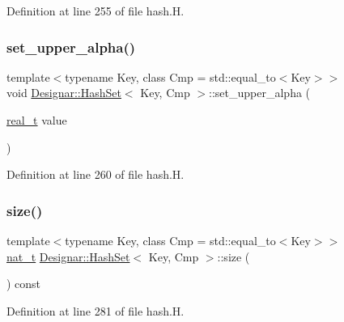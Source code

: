 Definition at line 255 of file hash.\+H.

\mbox{\label{class_designar_1_1_hash_set_a7d15d7b087df1da351a6820396ca3456}} 
\subsubsection{\texorpdfstring{set\+\_\+upper\+\_\+alpha()}{set\_upper\_alpha()}}
{\footnotesize\ttfamily template$<$typename Key, class Cmp = std\+::equal\+\_\+to$<$\+Key$>$$>$ \\
void \hyperlink{class_designar_1_1_hash_set}{Designar\+::\+Hash\+Set}$<$ Key, Cmp $>$\+::set\+\_\+upper\+\_\+alpha (\begin{DoxyParamCaption}\item[{\hyperlink{namespace_designar_aca2c32af26808dbec1f3a3071fad25ce}{real\+\_\+t}}]{value }\end{DoxyParamCaption})\hspace{0.3cm}{\ttfamily [inline]}}



Definition at line 260 of file hash.\+H.

\mbox{\label{class_designar_1_1_hash_set_a0026e1b2caf94d25b554cd6a399f691f}} 
\subsubsection{\texorpdfstring{size()}{size()}}
{\footnotesize\ttfamily template$<$typename Key, class Cmp = std\+::equal\+\_\+to$<$\+Key$>$$>$ \\
\hyperlink{namespace_designar_aa72662848b9f4815e7bf31a7cf3e33d1}{nat\+\_\+t} \hyperlink{class_designar_1_1_hash_set}{Designar\+::\+Hash\+Set}$<$ Key, Cmp $>$\+::size (\begin{DoxyParamCaption}{ }\end{DoxyParamCaption}) const\hspace{0.3cm}{\ttfamily [inline]}}



Definition at line 281 of file hash.\+H.

